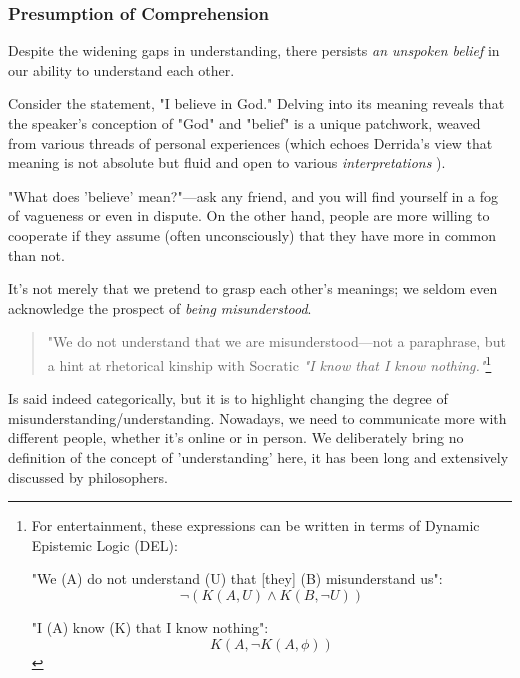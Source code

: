 \documentclass[11pt,a4]{article}
\begin{document}
        \subsubsection{Presumption of Comprehension}
            Despite the widening gaps in understanding, there persists
            \textit{an unspoken belief} in our ability to understand each other.

            Consider the statement, "I believe in God." Delving into its meaning
            reveals that the speaker's conception of "God" and "belief" is a unique patchwork, weaved from various threads of personal experiences
            (which echoes Derrida's view that meaning is not
            absolute but fluid and open to
            various \textit{interpretations} \cite{Deconstruction}).

            "What does 'believe' mean?"---ask any friend, and you will find
            yourself in a fog of vagueness or even in dispute. On the other hand,
            people are more willing to cooperate if they assume (often unconsciously)
            that they have more in common than not. 



            It's not merely that we pretend to grasp each other's meanings; we seldom even acknowledge the prospect of \textit{being misunderstood}.

             \begin{quote}
            "We do not understand that we are misunderstood—not a paraphrase, but a hint at rhetorical kinship with Socratic \textit{"I know that I know nothing."}\footnote{For entertainment, these expressions can be written in terms of Dynamic Epistemic Logic (DEL):

            "We (A) do not understand (U) that [they] (B) misunderstand us":
            \[\neg (K(A, U) \land K(B, \neg U))\]

            "I (A) know (K) that I know nothing":
            \[K(A, \neg K(A, \phi))\]
            }
            \end{quote}

            Is said indeed categorically, but it is to highlight changing the degree
            of misunderstanding/understanding. Nowadays, we need to communicate more with different people,
            whether it's online or in person. We deliberately bring no definition of the concept
            of 'understanding' here, it has been long and extensively
            discussed by philosophers.
\end{document}
